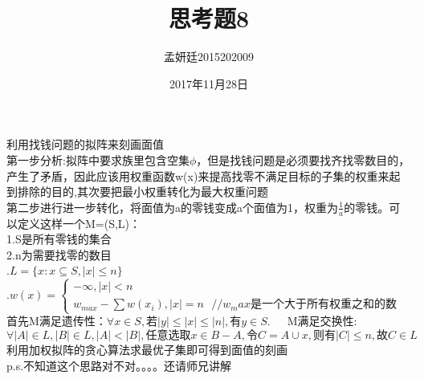 \documentclass[19pt,a4paper]{article}
\title{思考题8}
\author{孟妍廷2015202009}
\date{2017年11月28日}
\begin{document}
\maketitle
利用找钱问题的拟阵来刻画面值\\
\indent 第一步分析:拟阵中要求族里包含空集$\phi$，但是找钱问题是必须要找齐找零数目的，产生了矛盾，因此应该用权重函数w(x)来提高找零不满足目标的子集的权重来起到排除的目的,其次要把最小权重转化为最大权重问题\\
\indent 第二步进行进一步转化，将面值为a的零钱变成a个面值为1，权重为$\frac{1}{a}$的零钱。可以定义这样一个M=(S,L)：\\
\indent 1.S是所有零钱的集合\\
\indent 2.n为需要找零的数目\\
.$L=\{x:x\subseteq S,|x|\le n\}$\\
.$w(x)=\left\{
\begin{aligned}
-\infty,|x|<n\\
w_{max}-\sum w(x_i),|x|=n\ \ \ //w_max是一个大于所有权重之和的数
\end{aligned}
\right.$\\
\indent 首先M满足遗传性：$\forall x\in S,若|y|\le|x|\le|n|,有y\in S$.\ \ \ M满足交换性:$\forall |A|\in L,|B|\in L,|A|<|B|,任意选取x\in B-A,令C=A\cup x,则有|C|\le n,故C\in L$\\
\indent 利用加权拟阵的贪心算法求最优子集即可得到面值的刻画\\
p.s.不知道这个思路对不对。。。。还请师兄讲解
\end{document}
